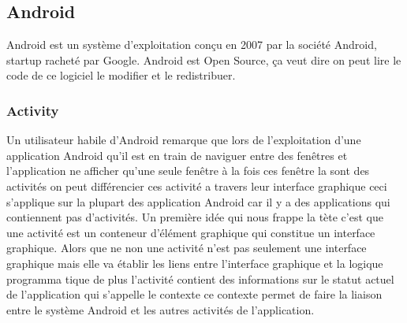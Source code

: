 %
%

\subsection{Android}

Android est un système d'exploitation conçu en 2007  par la
société Android, startup racheté par Google. Android est Open Source, ça veut
dire on peut lire le code de ce logiciel le modifier et le redistribuer.

\subsubsection{Activity}

Un utilisateur habile d'Android remarque que lors de l'exploitation d'une
application Android qu'il est en train de naviguer entre des fenêtres et
l'application ne afficher qu'une seule fenêtre à la fois ces fenêtre la sont
des activités on peut différencier ces activité a travers leur interface
graphique ceci s'applique sur la plupart des application Android car il y a des
applications qui contiennent pas d'activités. Un première idée qui nous frappe
la tète c'est que une activité est un conteneur d'élément graphique qui
constitue un interface graphique. Alors que ne non une activité n'est pas
seulement une interface graphique mais elle va établir les liens entre
l'interface graphique et la logique programma tique de plus l'activité contient
des informations sur le statut actuel de l'application qui s'appelle le
contexte ce contexte permet de faire la liaison entre le système Android et les
autres activités de l'application.

